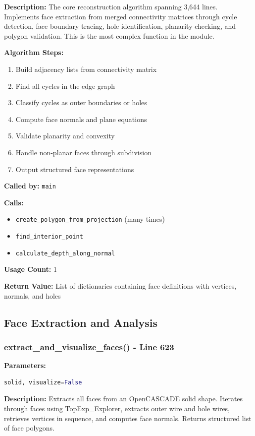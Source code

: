 \documentclass[11pt,a4paper]{article}
\begin{document}
\textbf{Description:} 
The core reconstruction algorithm spanning 3,644 lines. Implements face extraction from merged connectivity matrices through cycle detection, face boundary tracing, hole identification, planarity checking, and polygon validation. This is the most complex function in the module.

\textbf{Algorithm Steps:}
\begin{enumerate}
    \item Build adjacency lists from connectivity matrix
    \item Find all cycles in the edge graph
    \item Classify cycles as outer boundaries or holes
    \item Compute face normals and plane equations
    \item Validate planarity and convexity
    \item Handle non-planar faces through subdivision
    \item Output structured face representations
\end{enumerate}

\textbf{Called by:} \texttt{main}

\textbf{Calls:} 
\begin{itemize}
    \item \texttt{create\_polygon\_from\_projection} (many times)
    \item \texttt{find\_interior\_point}
    \item \texttt{calculate\_depth\_along\_normal}
\end{itemize}

\textbf{Usage Count:} 1

\textbf{Return Value:} List of dictionaries containing face definitions with vertices, normals, and holes

\subsection{Face Extraction and Analysis}

\subsubsection{extract\_and\_visualize\_faces() - Line 623}
\textbf{Parameters:} 
\begin{lstlisting}[language=Python]
solid, visualize=False
\end{lstlisting}

\textbf{Description:}
Extracts all faces from an OpenCASCADE solid shape. Iterates through faces using TopExp\_Explorer, extracts outer wire and hole wires, retrieves vertices in sequence, and computes face normals. Returns structured list of face polygons.
\end{document}
